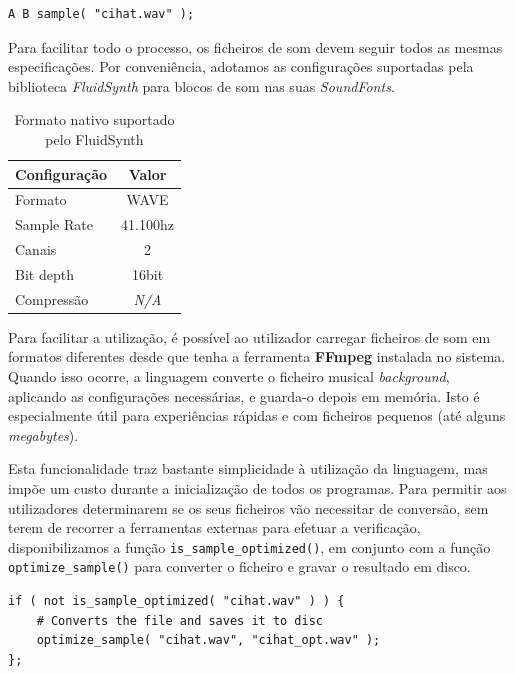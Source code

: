 \begin{lstlisting}[caption=Exemplo de reproduzir um ficheiro a seguir a duas notas]
A B sample( "cihat.wav" );
\end{lstlisting}

Para facilitar todo o processo, os ficheiros de som devem seguir todos as mesmas especificações. Por conveniência, adotamos as configurações suportadas pela biblioteca \textit{FluidSynth} para blocos de som nas suas \textit{SoundFonts}.

\begin{table}[h]
\centering
\def\arraystretch{1.3}
\begin{tabular}{|l|c|}
\hline
\textbf{Configuração} & \textbf{Valor} \\ \hline
Formato               & WAVE           \\ \hline
Sample Rate           & 41.100hz       \\ \hline
Canais                & 2              \\ \hline
Bit depth             & 16bit          \\ \hline
Compressão            & \textit{N/A}   \\ \hline
\end{tabular}
\caption{Formato nativo suportado pelo FluidSynth}
\end{table}

Para facilitar a utilização, é possível ao utilizador carregar ficheiros de som em formatos diferentes desde que tenha a ferramenta \textbf{FFmpeg} instalada no sistema. Quando isso ocorre, a linguagem converte o ficheiro musical \textit{background}, aplicando as configurações necessárias, e guarda-o depois em memória. Isto é especialmente útil para experiências rápidas e com ficheiros pequenos (até alguns \textit{megabytes}).

Esta funcionalidade traz bastante simplicidade à utilização da linguagem, mas impõe um custo durante a inicialização de todos os programas. Para permitir aos utilizadores determinarem se os seus ficheiros vão necessitar de conversão, sem terem de recorrer a ferramentas externas para efetuar a verificação, disponibilizamos a função \texttt{is\_sample\_optimized()}, em conjunto com a função \texttt{optimize\_sample()} para converter o ficheiro e gravar o resultado em disco.

\begin{lstlisting}[caption={Verificar se um ficheiro de audio está optimizado, e convertê-lo caso contrário}]
if ( not is_sample_optimized( "cihat.wav" ) ) {
    # Converts the file and saves it to disc
    optimize_sample( "cihat.wav", "cihat_opt.wav" );
};
\end{lstlisting}


